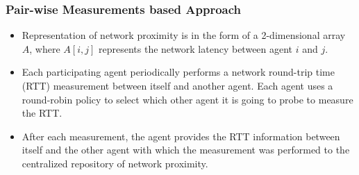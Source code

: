 \subsubsection{Pair-wise Measurements based Approach}
\begin{itemize}
\item Representation of network proximity is in the form of a 2-dimensional array $A$, where $A [ i, j ]$ represents the network latency between agent $i$ and $j$. 
\item Each participating agent periodically performs a network round-trip time (RTT) measurement between itself and another agent. Each agent uses a round-robin policy to select which other agent it is going to probe to measure the RTT. 
\item After each measurement, the agent provides the RTT information between itself and the other agent with which the measurement was performed to the centralized repository of network proximity.
\end{itemize}

